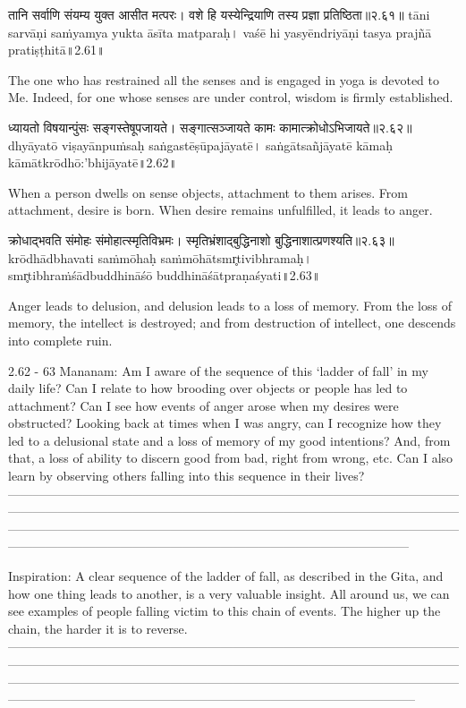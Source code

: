 तानि सर्वाणि संयम्य युक्त आसीत मत्परः।
 वशे हि यस्येन्द्रियाणि तस्य प्रज्ञा प्रतिष्ठिता॥२.६१॥
tāni sarvāṇi saṁyamya yukta āsīta matparaḥ।
vaśē hi yasyēndriyāṇi tasya prajñā pratiṣṭhitā॥2.61॥

The one who has restrained all the senses and is engaged in yoga is devoted to Me. Indeed, for one whose senses are under control, wisdom is firmly established. 


ध्यायतो विषयान्पुंसः सङ्गस्तेषूपजायते। 
सङ्गात्सञ्जायते कामः कामात्क्रोधोऽभिजायते॥२.६२॥
dhyāyatō viṣayānpuṁsaḥ saṅgastēṣūpajāyatē। 
saṅgātsañjāyatē kāmaḥ kāmātkrōdhō:'bhijāyatē॥2.62॥

When a person dwells on sense objects, attachment to them arises. From attachment, desire is born. When desire remains unfulfilled, it leads to anger.


क्रोधाद्भवति संमोहः संमोहात्स्मृतिविभ्रमः। 
स्मृतिभ्रंशाद्बुद्धिनाशो बुद्धिनाशात्प्रणश्यति॥२.६३॥
krōdhādbhavati saṁmōhaḥ saṁmōhātsmr̥tivibhramaḥ। 
smr̥tibhraṁśādbuddhināśō buddhināśātpraṇaśyati॥2.63॥


Anger leads to delusion, and delusion leads to a loss of memory. From the loss of memory, the intellect is destroyed; and from destruction of intellect, one descends into complete ruin.

2.62 - 63 Mananam:
Am I aware of the sequence of this ‘ladder of fall’ in my daily life? Can I relate to how brooding over objects or people has led to attachment? Can I see how events of anger arose when my desires were obstructed?
Looking back at times when I was angry, can I recognize how they led to a delusional state and a loss of memory of my good intentions? And, from that, a loss of ability to discern good from bad, right from wrong, etc. Can I also learn by observing others falling into this sequence in their lives?
—---------------------------------------------------------------------------------------------------------------------------------------------------------------------------------------------------------------------------------------------------------------------------------------------------------------------------------------------------------------------------------------------------------------------------------
 
Inspiration:
A clear sequence of the ladder of fall, as described in the Gita, and how one thing leads to another, is a very valuable insight. All around us, we can see examples of people falling victim to this chain of events. The higher up the chain, the harder it is to reverse.
—-----------------------------------------------------------------------------------------------------------------------------------------------------------------------------------------------------------------------------------------------------------------------------------------------------------------------------------------------------------------------------------------------------------------------------------


